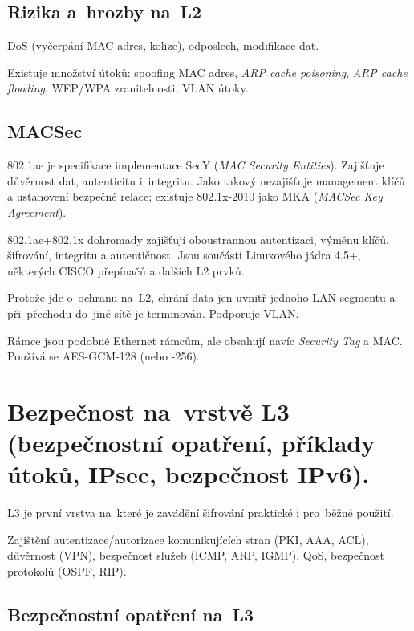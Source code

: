 \subsection{Rizika a~hrozby na~L2}

DoS (vyčerpání MAC adres, kolize), odposlech, modifikace dat.

Existuje množství útoků: spoofing MAC adres, \emph{ARP cache poisoning}, \emph{ARP cache flooding}, WEP/WPA zranitelnosti, VLAN útoky.



\subsection{MACSec}

802.1ae je specifikace implementace SecY (\emph{MAC Security Entities}).
Zajišťuje důvěrnost dat, autenticitu i~integritu.
Jako takový nezajišťuje management klíčů a ustanovení bezpečné relace; existuje 802.1x-2010 jako MKA (\emph{\mbox{MACSec} Key Agreement}).

802.1ae+802.1x dohromady zajišťují oboustrannou autentizaci, výměnu klíčů, šifrování, integritu a autentičnost.
Jsou součástí Linuxového jádra 4.5+, některých CISCO přepínačů a dalších L2 prvků.

Protože jde o~ochranu na~L2, chrání data jen uvnitř jednoho LAN segmentu a při~přechodu do~jiné sítě je terminován.
Podporuje VLAN.

Rámce jsou podobné Ethernet rámcům, ale obsahují navíc \emph{Security Tag} a MAC.
Používá se AES-GCM-128 (nebo -256).


\clearpage
\section{Bezpečnost na~vrstvě L3 (bezpečnostní opatření, příklady útoků, IPsec, bezpečnost IPv6).}

L3 je první vrstva na~které je zavádění šifrování praktické i pro~běžné použití.

Zajištění autentizace/autorizace komunikujících stran (PKI, AAA, ACL), důvěrnost (VPN), bezpečnost služeb (ICMP, ARP, IGMP), QoS, bezpečnost protokolů (OSPF, RIP).


\subsection{Bezpečnostní opatření na~L3}

